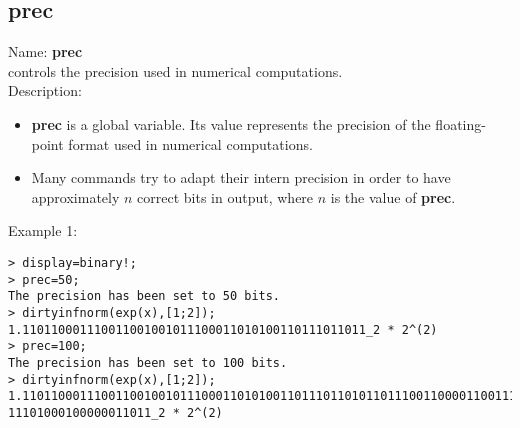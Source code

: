 \subsection{prec}
\label{labprec}
\noindent Name: \textbf{prec}\\
controls the precision used in numerical computations.\\

\noindent Description: \begin{itemize}

\item \textbf{prec} is a global variable. Its value represents the precision of the 
   floating-point format used in numerical computations.

\item Many commands try to adapt their intern precision in order to have 
   approximately $n$ correct bits in output, where $n$ is the value of \textbf{prec}.
\end{itemize}
\noindent Example 1: 
\begin{center}\begin{minipage}{15cm}\begin{Verbatim}[frame=single]
> display=binary!;
> prec=50;
The precision has been set to 50 bits.
> dirtyinfnorm(exp(x),[1;2]);
1.110110001110011001001011100011010100110111011011_2 * 2^(2)
> prec=100;
The precision has been set to 100 bits.
> dirtyinfnorm(exp(x),[1;2]);
1.110110001110011001001011100011010100110111011010110111001100001100111010001110
11101000100000011011_2 * 2^(2)
\end{Verbatim}
\end{minipage}\end{center}
